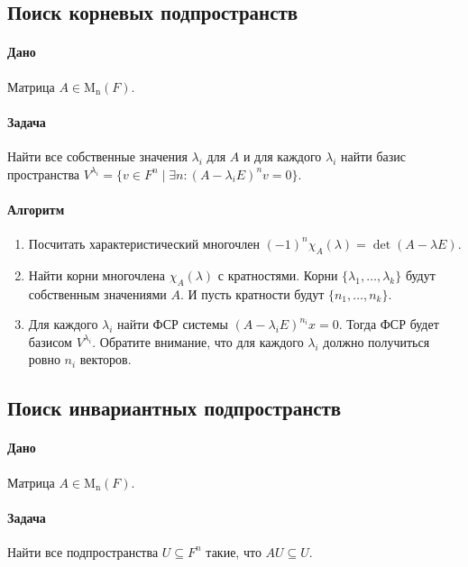 \documentclass{article}
\newcommand{\Matrix}[2]{\operatorname{\mathrm{M}_{#2}}(#1)}
\begin{document}
\subsection{Поиск корневых подпространств}

\paragraph{Дано} Матрица $A\in\Matrix{F}{n}$.


\paragraph{Задача} Найти все собственные значения $\lambda_i$ для $A$ и для каждого $\lambda_i$ найти базис пространства $V^{\lambda_i} = \{v\in F^{n}\mid \exists n\colon (A - \lambda_i E)^n v = 0\}$.

\paragraph{Алгоритм}
\begin{enumerate}
\item Посчитать характеристический многочлен $(-1)^n\chi_A(\lambda) = \det(A-\lambda E)$.

\item Найти корни многочлена $\chi_A(\lambda)$ с кратностями. Корни $\{\lambda_1,\ldots,\lambda_k\}$ будут собственным значениями $A$. И пусть кратности будут $\{n_1,\ldots, n_k\}$.

\item Для каждого $\lambda_i$ найти ФСР системы $(A-\lambda_i E)^{n_i}x = 0$. Тогда ФСР будет базисом $V^{\lambda_i}$. Обратите внимание, что для каждого $\lambda_i$ должно получиться ровно $n_i$ векторов.
\end{enumerate}


\subsection{Поиск инвариантных подпространств}

\paragraph{Дано} Матрица $A\in\Matrix{F}{n}$.

\paragraph{Задача} Найти все подпространства $U\subseteq F^n$ такие, что $A U \subseteq U$.
\end{document}
